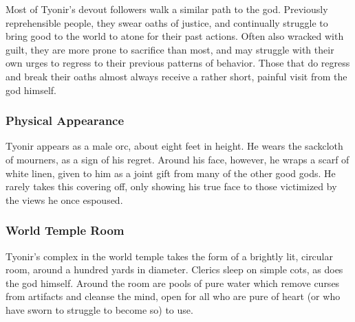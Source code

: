 Most of Tyonir's devout followers walk a similar path to the god.
Previously reprehensible people, they swear oaths of justice, and continually struggle to bring good to the world to atone for their past actions.
Often also wracked with guilt, they are more prone to sacrifice than most, and may struggle with their own urges to regress to their previous patterns of behavior.
Those that do regress and break their oaths almost always receive a rather short, painful visit from the god himself.

\subsubsection*{Physical Appearance}
Tyonir appears as a male orc, about eight feet in height.
He wears the sackcloth of mourners, as a sign of his regret.
Around his face, however, he wraps a scarf of white linen, given to him as a joint gift from many of the other good gods.
He rarely takes this covering off, only showing his true face to those victimized by the views he once espoused.

\subsubsection*{World Temple Room}
Tyonir's complex in the world temple takes the form of a brightly lit, circular room, around a hundred yards in diameter.
Clerics sleep on simple cots, as does the god himself.
Around the room are pools of pure water which remove curses from artifacts and cleanse the mind, open for all who are pure of heart (or who have sworn to struggle to become so) to use.
